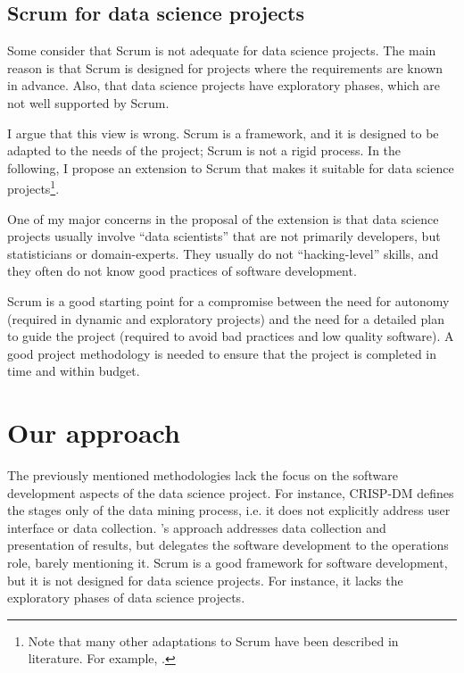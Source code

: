 \subsection{Scrum for data science projects}

Some consider that Scrum is not adequate for data science projects.  The main reason is
that Scrum is designed for projects where the requirements are known in advance.  Also,
that data science projects have exploratory phases, which are not well supported by Scrum.

I argue that this view is wrong.  Scrum is a framework, and it is designed to be adapted to
the needs of the project;  Scrum is not a rigid process.  In the following, I propose an
extension to Scrum that makes it suitable for data science projects\footnote{Note that
many other adaptations to Scrum have been described in literature.  For example,
.}.

One of my major concerns in the proposal of the extension is that data science projects
usually involve ``data scientists'' that are not primarily developers, but statisticians or
domain-experts.  They usually do not ``hacking-level'' skills, and they often do not know
good practices of software development.

Scrum is a good starting point for a compromise between the need for autonomy (required in
dynamic and exploratory projects) and the need for a detailed plan to guide the project
(required to avoid bad practices and low quality software). A good project methodology is
needed to ensure that the project is completed in time and within budget.

\section{Our approach}
\label{sec:our-approach}

The previously mentioned methodologies lack the focus on the software development aspects of
the data science project.  For instance, CRISP-DM defines the stages only of the data
mining process, i.e. it does not explicitly address user interface or data collection.
\citeauthor{Zumel2019}'s approach addresses data collection and presentation of results, but
delegates the software development to the operations role, barely mentioning it.  Scrum is
a good framework for software development, but it is not designed for data science
projects.  For instance, it lacks the exploratory phases of data science projects.

